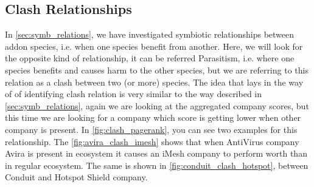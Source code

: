 \documentclass[11pt,oneside]{book}
\let\Oldsubsection\subsection
\renewcommand{\subsection}{\FloatBarrier\Oldsubsection}
\begin{document}
\subsection{Clash Relationships}
\label{sec:clash_relations}

In \autoref{sec:symb_relations}, we have investigated symbiotic relationships between addon species, i.e. when one species benefit from another. Here, we will look for the opposite kind of relationship, it can be referred Parasitism, i.e. where one species benefits and causes harm to the other species, but we are referring to this relation as a clash between two (or more) species. The idea that lays in the way of of identifying clash relation is very similar to the way described in \autoref{sec:symb_relations}, again we are looking at the aggregated company scores, but this time we are looking for a company which score is getting lower when other company is present. In \autoref{fig:clash_pagerank}, you can see two examples for this relationship. The \autoref{fig:avira_clash_imesh} shows that when AntiVirus company Avira is present in ecosystem it causes an iMesh company to perform worth than in regular ecosystem. The same is shown in \autoref{fig:conduit_clash_hotspot}, between Conduit and Hotspot Shield company.
\end{document}
